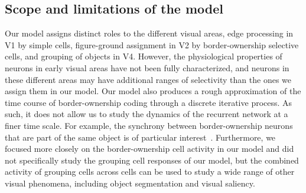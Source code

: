 \subsection{Scope and limitations of the model}
Our model assigns distinct roles to the
different visual areas,  \eg edge processing in V1 by simple cells, figure-ground
assignment in V2 by border-ownership selective cells, and grouping of objects in V4. However,
the physiological properties of neurons in early visual areas have not
been fully characterized, and 
neurons in these different
areas may have 
additional ranges of selectivity
than the ones we assign them in our model. 
Our model also produces a rough approximation of the time course of border-ownership
coding through a discrete iterative process. As such, it does not allow us to study the dynamics of the recurrent network at a finer time scale. For example, the synchrony between border-ownership neurons that are part of the same object is of particular interest~\citep{Martin_vonderHeydt15,Wagatsuma_etal16a}. Furthermore, we focused more closely on the border-ownership cell activity in our model and did not specifically study the grouping cell responses of our model, but the combined activity of grouping cells across cells can be used to
study a wide range of other visual phenomena, including object segmentation and visual saliency.

